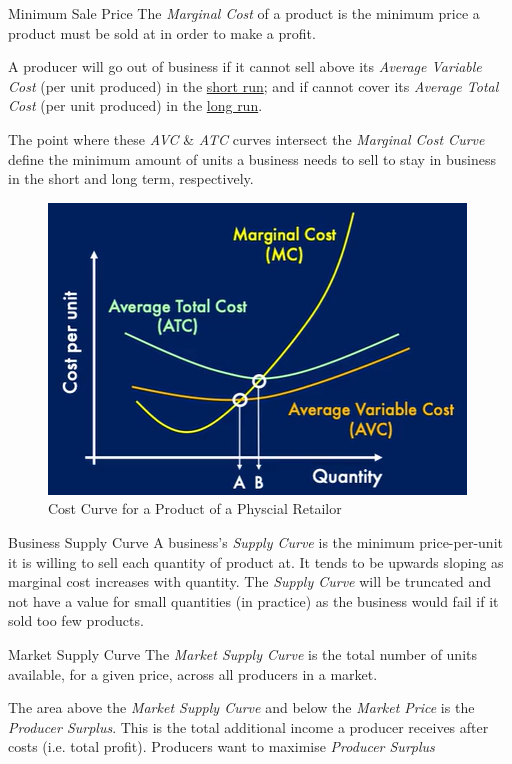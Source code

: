 \documentclass[11pt,a4paper]{article}
\begin{document}
\begin{remark}{Minimum Sale Price}
  The \textit{Marginal Cost} of a product is the minimum price a product must be sold at in order to make a profit.

  \par A producer will go out of business if it cannot sell above its \textit{Average Variable Cost} (per unit produced) in the \underline{short run}; and if cannot cover its \textit{Average Total Cost} (per unit produced) in the \underline{long run}.

  \par The point where these \textit{AVC} \& \textit{ATC} curves intersect the \textit{Marginal Cost Curve} define the minimum amount of units a business needs to sell to stay in business in the short and long term, respectively.
\end{remark}

\begin{figure}[ht!]
  \centering
  \includegraphics[width=.5\textwidth]{physicalCostCurve.PNG}
  \caption{Cost Curve for a Product of a Physcial Retailor}
\end{figure}

\begin{definition}{Business Supply Curve}
  A business's \textit{Supply Curve} is the minimum price-per-unit it is willing to sell each quantity of product at. It tends to be upwards sloping as marginal cost increases with quantity. The \textit{Supply Curve} will be truncated and not have a value for small quantities (in practice) as the business would fail if it sold too few products.
\end{definition}

\begin{definition}{Market Supply Curve}
  The \textit{Market Supply Curve} is the total number of units available, for a given price, across all producers in a market.

  \par The area above the \textit{Market Supply Curve} and below the \textit{Market Price} is the \textit{Producer Surplus}. This is the total additional income a producer receives after costs (i.e. total profit). Producers want to maximise \textit{Producer Surplus}
\end{definition}
\end{document}
